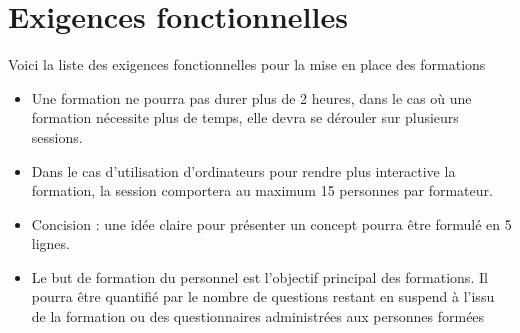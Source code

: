 \section{Exigences fonctionnelles}


Voici la liste des exigences fonctionnelles pour la mise en place des formations \\

\begin{itemize}

\item Une formation ne pourra pas durer plus de 2 heures, dans le cas où une
formation nécessite plus de temps, elle devra se dérouler sur plusieurs sessions.

\item Dans le cas d'utilisation d'ordinateurs pour rendre plus interactive la
formation, la session comportera au maximum 15 personnes par formateur.

\item Concision : une idée claire pour présenter un concept pourra être formulé
en 5 lignes. 

\item Le but de formation du personnel est l'objectif principal des formations. 
Il pourra être quantifié par le nombre de questions restant en suspend à l'issu
de la formation ou des questionnaires administrées aux personnes formées

\end{itemize}

